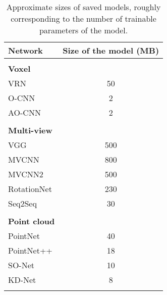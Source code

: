 \begin{table}[]
	\centering
	\begin{tabular}{lc}
		\hline
		\textbf{Network}       &\textbf{ Size of the model (MB)} \\ \hline
		                       &                       \\
		\textbf{Voxel }        &                       \\
		VRN                    &          50           \\
		O-CNN                  &           2           \\
		AO-CNN                 &           2           \\\hline
		                       &                       \\
		\textbf{Multi-view }   &                       \\
		VGG                    &          500          \\
		MVCNN                  &          800          \\
		MVCNN2                 &          500          \\
		RotationNet            &          230          \\
		Seq2Seq                &          30           \\\hline
		                       &                       \\
		\textbf{Point cloud  } &                       \\
		PointNet               &          40           \\
		PointNet++             &          18           \\
		SO-Net                 &          10           \\
		KD-Net                 &           8           \\\hline
		                       &                       \\ 
	\end{tabular}
\caption{Approximate sizes of saved models, roughly corresponding to the number of trainable parameters of the model.}
\label{Table:memory}
\end{table}